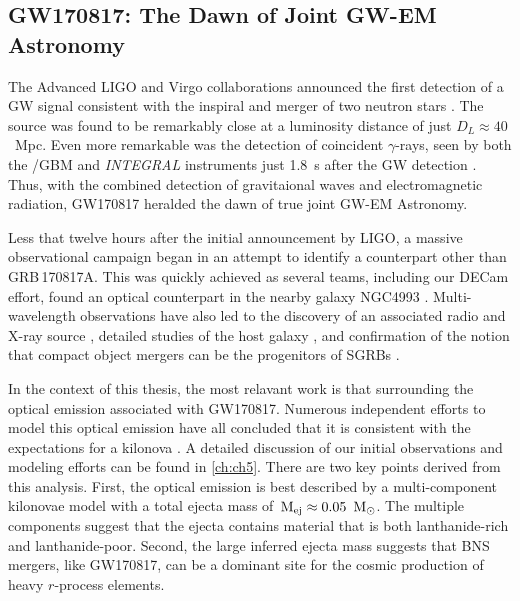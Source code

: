 \subsection{GW170817: The Dawn of Joint GW-EM Astronomy}
\label{sec:intro_gw170817}
The Advanced LIGO and Virgo collaborations announced the first detection of a GW signal consistent with the inspiral and merger of two neutron stars \citep{LIGOGW170817}. The source was found to be remarkably close at a luminosity distance of just $D_L \approx 40$~Mpc. Even more remarkable was the detection of coincident $\gamma$-rays, seen by both the \fermi/GBM and {\it INTEGRAL} instruments just 1.8~s after the GW detection \citep[GRB\,170814A;][]{LIGOGW170817grb,GW170817Fermi,Savchenko+17}. Thus, with the combined detection of gravitaional waves and electromagnetic radiation, GW170817 heralded the dawn of true joint GW-EM Astronomy.

Less that twelve hours after the initial announcement by LIGO, a massive observational campaign began in an attempt to identify a counterpart other than GRB\,170817A. This was quickly achieved as several teams, including our DECam effort, found an optical counterpart in the nearby galaxy NGC4993 \citep{LIGOMMAPaper,Arcavi+17,Coulter+17,GW170817DECam,Valenti+17}. Multi-wavelength observations have also led to the discovery of an associated radio and X-ray source \citep{Alexander+17,Davanzo+18,Margutti+17,Margutti+18,Mooley+18,Troja+17}, detailed studies of the host galaxy \citep{Blanchard+17,Cantiello+18}, and confirmation of the notion that compact object mergers can be the progenitors of SGRBs \citep{Fong+17}.

In the context of this thesis, the most relavant work is that surrounding the optical emission associated with GW170817. Numerous independent efforts to model this optical emission have all concluded that it is consistent with the expectations for a kilonova \citep{Cowp+17,Kilpatrick+17,Tanaka+17,Villar+17b, Tanaka+18}. A detailed discussion of our initial observations and modeling efforts can be found in \cref{ch:ch5}. There are two key points derived from this analysis. First, the optical emission is best described by a multi-component kilonovae model with a total ejecta mass of $\rm\,M_{\rm ej} \approx 0.05~{\rm\,M_\odot}$. The multiple components suggest that the ejecta contains material that is both lanthanide-rich and lanthanide-poor. Second, the large inferred ejecta mass suggests that BNS mergers, like GW170817, can be a dominant site for the cosmic production of heavy $r$-process elements.

